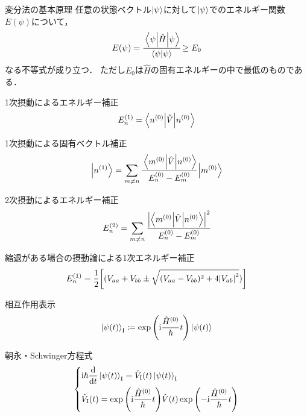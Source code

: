 \documentclass{report}
\begin{document}
  \begin{itembox}[l]{変分法の基本原理}
  任意の状態ベクトル$\ket{\psi}$に対して$\ket{\psi}$でのエネルギー関数$E(\psi)$について，
    \begin{align*}
      E(\psi) = \cfrac{\mel**{\psi}{\hat{H}}{\psi}}{\braket{\psi}} \geq E_0 \label{minimum}
    \end{align*}
  なる不等式が成り立つ．
  ただし$E_0$は$\hat{H}$の固有エネルギーの中で最低のものである．
  \end{itembox}
  \begin{itembox}[l]{1次摂動によるエネルギー補正}
    \begin{align*}
      E_n^{(1)} = \ev**{\hat{V}}{n^{(0)}}
    \end{align*}
  \end{itembox}
  \begin{itembox}[l]{1次摂動による固有ベクトル補正}
    \begin{align*}
      \ket{n^{(1)}} = \sum_{m\neq n}\cfrac{\mel**{m^{(0)}}{\hat{V}}{n^{(0)}}}{E_n^{(0)} - E_m^{(0)}}\ket{m^{(0)}}
    \end{align*}
  \end{itembox}
  \begin{itembox}[l]{2次摂動によるエネルギー補正}
    \begin{align*}
      E_n^{(2)} = \sum_{m\neq n}\cfrac{\abs{\mel**{m^{(0)}}{\hat{V}}{n^{(0)}}}^2}{E_n^{(0)} - E_m^{(0)}}
    \end{align*}
  \end{itembox}
  \begin{itembox}[l]{縮退がある場合の摂動論による1次エネルギー補正}
    \begin{align*}
      E_n^{(1)} = \frac{1}{2}\qty[(V_{aa} + V_{bb}\pm\sqrt{(V_{aa} - V_{bb})^2 + 4\abs{V_{ab}}^2})]
    \end{align*}
  \end{itembox}
  \begin{itembox}[l]{相互作用表示}
    \begin{align*}
      \ket{\psi(t)}_{\mathrm{I}} \coloneqq \exp\qty(\mathrm{i}\frac{\hat{H}^{(0)}}{\hbar}t)\ket{\psi(t)}
    \end{align*}
  \end{itembox}
  \begin{itembox}[l]{朝永・Schwinger方程式}
    \begin{align*}
      \begin{dcases}
        \mathrm{i}\hbar\dv{t}\ket{\psi(t)}_{\mathrm{I}} = \hat{V}_{\mathrm{I}}(t)\ket{\psi(t)}_{\mathrm{I}} \\
        \hat{V}_{\mathrm{I}}(t) = \exp\qty(\mathrm{i}\frac{\hat{H}^{(0)}}{\hbar}t)\hat{V}(t)\exp\qty(-\mathrm{i}\frac{\hat{H}^{(0)}}{\hbar}t)
      \end{dcases}
    \end{align*}
  \end{itembox}
\end{document}
